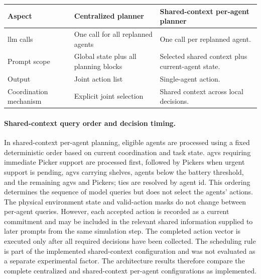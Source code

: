 \begin{center}
\begingroup
\small
\setlength{\tabcolsep}{4pt}
\captionsetup{type=table,hypcap=false}
\begin{tabular}{|p{}|p{}|p{}|}
\hline
\textbf{Aspect} & \textbf{Centralized planner} & \textbf{Shared-context per-agent planner} \\
\hline
\gls{llm} calls & One call for all replanned agents & One call per replanned agent. \\
\hline
Prompt scope & Global state plus all planning blocks & Selected shared context plus current-agent state. \\
\hline
Output & Joint action list & Single-agent action. \\
\hline
Coordination mechanism & Explicit joint selection & Shared context across local decisions. \\
\hline
\end{tabular}
\caption{Comparison between centralized and shared-context per-agent planning architectures.}
\label{tab:centralized-shared-context-prompts}
\endgroup
\end{center}

\paragraph{Shared-context query order and decision timing.}
In shared-context per-agent planning, eligible agents are processed using a fixed deterministic order based on current coordination and task state.
\glspl{agv} requiring immediate Picker support are processed first, followed by Pickers when urgent support is pending, \glspl{agv} carrying shelves, agents below the battery threshold, and the remaining \glspl{agv} and Pickers; ties are resolved by agent id.
This ordering determines the sequence of model queries but does not select the agents' actions.
The physical environment state and valid-action masks do not change between per-agent queries.
However, each accepted action is recorded as a current commitment and may be included in the relevant shared information supplied to later prompts from the same simulation step.
The completed action vector is executed only after all required decisions have been collected.
The scheduling rule is part of the implemented shared-context configuration and was not evaluated as a separate experimental factor.
The architecture results therefore compare the complete centralized and shared-context per-agent configurations as implemented.

